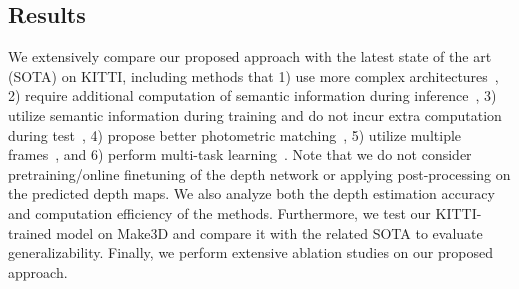 \documentclass{bmvc2k}
\begin{document}
\vspace{-10pt}
\subsection{Results}
\vspace{-5pt}
We extensively compare our proposed approach with the latest state of the art (SOTA) on KITTI, including methods that 1) use more complex architectures~\cite{guizilini20203d, johnston2020self, lyu2020hr}, 2) require additional computation of semantic information during inference~\cite{guizilini2020semantically}, 3) utilize semantic information during training and do not incur extra computation during test~\cite{klingner2020self}, 4) propose better photometric matching~\cite{jiang2020dipe, shu2020feature}, 5) utilize multiple frames~\cite{patil2020don}, and 6) perform multi-task learning~\cite{tosi2020distilled}. Note that we do not consider pretraining/online finetuning of the depth network or applying post-processing on the predicted depth maps. We also analyze both the depth estimation accuracy and computation efficiency of the methods. Furthermore, we test our KITTI-trained model on Make3D and compare it with the related SOTA to evaluate generalizability. Finally, we perform extensive ablation studies on our proposed approach.
\end{document}
